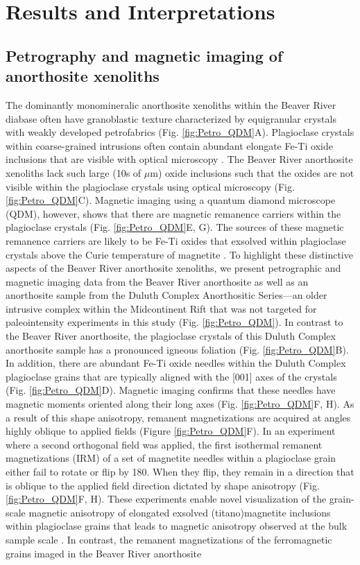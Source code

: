 \documentclass[9pt,twocolumn,twoside,lineno]{pnas-new}
\begin{document}
\section*{Results and Interpretations}

\subsection*{Petrography and magnetic imaging of anorthosite xenoliths}

The dominantly monomineralic anorthosite xenoliths within the Beaver River diabase often have granoblastic texture characterized by equigranular crystals with weakly developed petrofabrics (Fig. \ref{fig:Petro_QDM}A). Plagioclase crystals within coarse-grained intrusions often contain abundant elongate Fe-Ti oxide inclusions that are visible with optical microscopy \cite{Feinberg2006a, Wenk2011a, Ageeva2016a}. The Beaver River anorthosite xenoliths lack such large (10s of $\mu$m) oxide inclusions such that the oxides are not visible within the plagioclase crystals using optical microscopy (Fig. \ref{fig:Petro_QDM}C). Magnetic imaging using a quantum diamond microscope (QDM), however, shows that there are magnetic remanence carriers within the plagioclase crystals (Fig. \ref{fig:Petro_QDM}E, G). The sources of these magnetic remanence carriers are likely to be Fe-Ti oxides that exsolved within plagioclase crystals above the Curie temperature of magnetite \cite{Zhang2021b, Bian2021a}. To highlight these distinctive aspects of the Beaver River anorthosite xenoliths, we present petrographic and magnetic imaging data from the Beaver River anorthosite as well as an anorthosite sample from the Duluth Complex Anorthositic Series---an older intrusive complex within the Midcontinent Rift that was not targeted for paleointensity experiments in this study (Fig. \ref{fig:Petro_QDM}). In contrast to the Beaver River anorthosite, the plagioclase crystals of this Duluth Complex anorthosite sample has a pronounced igneous foliation (Fig. \ref{fig:Petro_QDM}B). In addition, there are abundant Fe-Ti oxide needles within the Duluth Complex plagioclase grains that are typically aligned with the [001] axes of the crystals (Fig. \ref{fig:Petro_QDM}D). Magnetic imaging confirms that these needles have magnetic moments oriented along their long axes (Fig. \ref{fig:Petro_QDM}F, H). As a result of this shape anisotropy, remanent magnetizations are acquired at angles highly oblique to applied fields (Figure \ref{fig:Petro_QDM}F). In an experiment where a second orthogonal field was applied, the first isothermal remanent magnetizations (IRM) of a set of magnetite needles within a plagioclase grain either fail to rotate or flip by 180\textdegree. When they flip, they remain in a direction that is oblique to the applied field direction dictated by shape anisotropy (Fig. \ref{fig:Petro_QDM}F, H). These experiments enable novel visualization of the grain-scale magnetic anisotropy of elongated exsolved (titano)magnetite inclusions within plagioclase grains that leads to magnetic anisotropy observed at the bulk sample scale \cite{Selkin2000a, Feinberg2006a}. In contrast, the remanent magnetizations of the ferromagnetic grains imaged in the Beaver River anorthosite 
\end{document}
